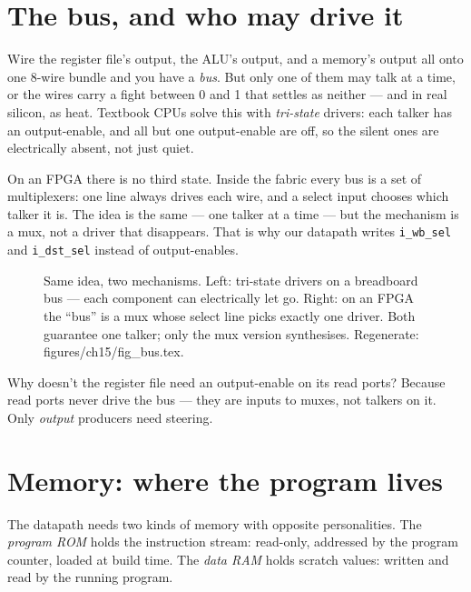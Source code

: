 \section{The bus, and who may drive it}\label{sec:bus15}

Wire the register file's output, the ALU's output, and a memory's
output all onto one 8-wire bundle and you have a \emph{bus}. But only
one of them may talk at a time, or the wires carry a fight between 0
and 1 that settles as neither --- and in real silicon, as heat.
Textbook CPUs solve this with \emph{tri-state} drivers: each talker
has an output-enable, and all but one output-enable are off, so the
silent ones are electrically absent, not just quiet.

On an FPGA there is no third state. Inside the fabric every bus is a
set of multiplexers: one line always drives each wire, and a select
input chooses which talker it is. The idea is the same --- one talker
at a time --- but the mechanism is a mux, not a driver that disappears.
That is why our datapath writes \texttt{i\_wb\_sel} and
\texttt{i\_dst\_sel} instead of output-enables.

\begin{figure}[htbp]
\centering

\caption{Same idea, two mechanisms. Left: tri-state drivers on a
breadboard bus --- each component can electrically let go. Right: on
an FPGA the ``bus'' is a mux whose select line picks exactly one
driver. Both guarantee one talker; only the mux version synthesises.
Regenerate: \ttfamily figures/ch15/fig\_bus.tex.}
\label{fig:bus15}
\end{figure}

\begin{checkpoint}
Why doesn't the register file need an output-enable on its read
ports? Because read ports never drive the bus --- they are inputs to
muxes, not talkers on it. Only \emph{output} producers need steering.
\end{checkpoint}

\section{Memory: where the program lives}\label{sec:memory15}

The datapath needs two kinds of memory with opposite personalities.
The \emph{program ROM} holds the instruction stream: read-only,
addressed by the program counter, loaded at build time. The \emph{data
RAM} holds scratch values: written and read by the running program.

